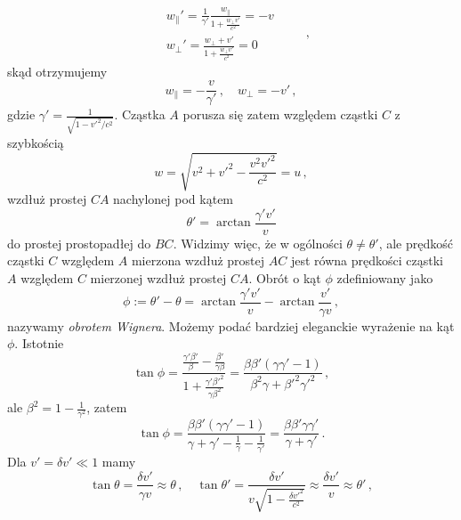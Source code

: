 \documentclass[../main.tex]{subfiles}
\begin{document}
\begin{equation*}
    \begin{split}
        &w_\parallel '=\frac{1}{\gamma'}\frac{w_\parallel}{1+\frac{w_\perp v'}{c^2}}=-v\\
        &w_\perp'=\frac{w_\perp+v'}{1+\frac{w_\perp v'}{c^2}}=0
    \end{split}\quad\quad\,,
\end{equation*}
skąd otrzymujemy
\begin{equation*}
    w_\parallel=-\frac{v}{\gamma'}\,,\quad w_\perp=-v'\,,
\end{equation*}
gdzie \(\gamma'=\frac{1}{\sqrt{1-v'^2/c^2}}\). Cząstka \(A\) porusza się zatem względem cząstki \(C\) z szybkością
\begin{equation*}
    w=\sqrt{v^2+v'^2-\frac{v^2v'^2}{c^2}}=u\,,
\end{equation*}
wzdłuż prostej \(CA\) nachylonej pod kątem
\begin{equation*}
    \theta'=\arctan\frac{\gamma'v'}{v}
\end{equation*}
do prostej prostopadłej do \(BC\). Widzimy więc, że w ogólności \(\theta\neq\theta'\), ale prędkość cząstki \(C\) względem \(A\) mierzona wzdłuż prostej \(AC\) jest równa prędkości cząstki \(A\) względem \(C\) mierzonej wzdłuż prostej \(CA\). Obrót  o kąt \(\phi\) zdefiniowany jako
\begin{equation*}
    \phi:=\theta'-\theta=\arctan\frac{\gamma'v'}{v}-\arctan\frac{v'}{\gamma v}\,,
\end{equation*}
nazywamy \textit{obrotem Wignera}. Możemy podać bardziej eleganckie wyrażenie na kąt \(\phi\). Istotnie
\begin{equation*}
    \tan\phi=\frac{\frac{\gamma'\beta'}{\beta}-\frac{\beta'}{\gamma\beta}}{1+\frac{\gamma'\beta'^2}{\gamma\beta^2}}=\frac{\beta\beta'(\gamma\gamma'-1)}{\beta^2\gamma+\beta'^2\gamma'^2}\,,
\end{equation*}
ale \(\beta^2=1-\frac{1}{\gamma^2}\), zatem
\begin{equation*}
    \tan\phi=\frac{\beta\beta'(\gamma\gamma'-1)}{\gamma+\gamma'-\frac{1}{\gamma}-\frac{1}{\gamma'}}=\frac{\beta\beta'\gamma\gamma'}{\gamma+\gamma'}\,.
\end{equation*}
Dla \(v'=\delta v'\ll 1\) mamy
\begin{equation*}
    \tan\theta=\frac{\delta v'}{\gamma v}\approx\theta\,,\quad \tan\theta'=\frac{\delta v'}{v\sqrt{1-\frac{\delta v'^2}{c^2}}}\approx \frac{\delta v'}{v}\approx \theta'\,,
\end{equation*}
\end{document}
